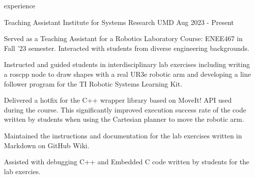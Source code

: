\begin{section}{experience}

  \begin{work}
    {Teaching Assistant}
    {Institute for Systems Research}
    {UMD}
    {Aug 2023 - Present}

    \item Served as a Teaching Assistant for a Robotics Laboratory Course:
          ENEE467 in Fall '23 semester. Interacted with students from
          diverse engineering backgrounds.

    \item Instructed and guided students in interdisciplinary lab exercises
          including writing a roscpp node to draw shapes with a real UR3e
          robotic arm and developing a line follower program for the TI Robotic
          Systems Learning Kit.

    \item Delivered a hotfix for the C++ wrapper library based on MoveIt!
          API used during the course. This significantly improved execution
          success rate of the code written by students when using the Cartesian
          planner to move the robotic arm.

    \item Maintained the instructions and documentation for the lab exercises
          written in Markdown on GitHub Wiki.

    \item Assisted with debugging C++ and Embedded C code written by students
          for the lab exercies.



  \end{work}




\end{section}
